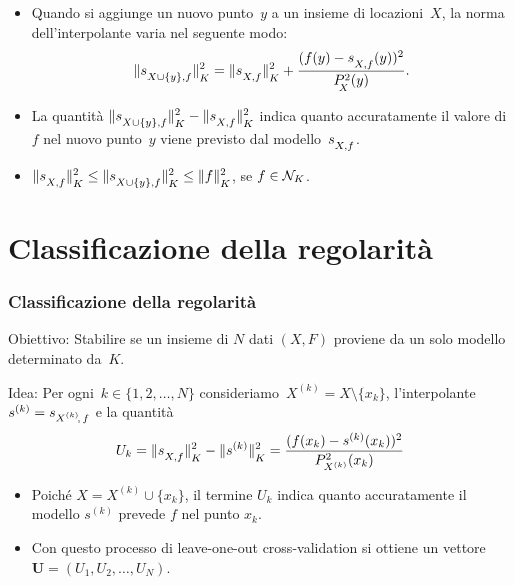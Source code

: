 \documentclass[10pt]{beamer}
\theoremstyle{definition}
\theoremstyle{plain}
\def\Cal#1{{\cal #1}}
\def\norm#1{\Vert #1\Vert}
\def\lK{{\lower.5ex\hbox{$\scriptstyle K$}}}
\def\lX{{\!\!\lower.5ex\hbox{$\scriptstyle X$}}}
\def\lXf{{\lower.5ex\hbox{$\scriptstyle X, f$}}}
\def\lXyf{{\lower.5ex\hbox{$\scriptstyle X\cup\{y\}, f$}}}
\begin{document}
\begin{frame}
\begin{itemize}
\item
 Quando si aggiunge un nuovo punto~$y$ a un insieme di locazioni~$X$, la norma dell’interpolante varia nel seguente modo:
$$
\norm{s_\lXyf}^2_\lK = \norm{s_\lXf}^2_\lK + \frac{(f(y) - s_\lXf(y))^2}{P^2_\lX(y)}.
$$

\bigskip

\item
La quantità $\norm{s_\lXyf}^2_\lK - \norm{s_\lXf}^2_\lK$ indica quanto accuratamente il valore di $f$ nel nuovo punto~$y$ viene previsto dal modello~$s_\lXf$.

\bigskip

\item
$\norm{s_\lXf}^2_\lK\leq\norm{s_\lXyf}^2_\lK\leq\norm f_\lK^2$, se $f\in\Cal N_K$.

\end{itemize}
\end{frame}



\section{Classificazione della regolarità}
\begin{frame}
\frametitle{Classificazione della regolarità}
\alert{Obiettivo}: Stabilire se un insieme di $N$ dati $(X, F)$ proviene da un solo modello determinato da~$K$.
\bigskip

\alert{Idea}: Per ogni~$k\in\{1,2,\dots, N\}$ consideriamo~$X^{(k)} = X\setminus \{x_k\}$, l’interpolante $s^{(k)} = s_{\hbox{$\scriptstyle X^{(k)}\!,\, f$}}$ e la quantità
$$
U_k = \norm{s_\lXf}^2_\lK - \norm{s^{(k)}}^2_\lK = \frac{(f(x_k) - s^{(k)}(x_k))^2}{P^2_{X^{(k)}}(x_k)}
$$
\begin{itemize}
\item
Poiché $X=X^{(k)}\cup\{x_k\}$, il termine $U_k$
indica quanto accuratamente il modello $s^{(k)}$ prevede $f$ nel punto $x_k$.
\item
Con questo processo di \alert{leave-one-out cross-validation} si ottiene  un vettore $\bm U = (U_1,U_2,\dots, U_N)$.
\end{itemize}
\end{frame}
\end{document}

